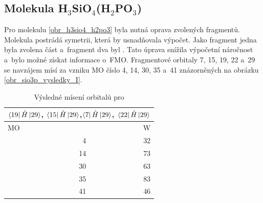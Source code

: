 \documentclass[
  printed, %
  table,   %
  lof,     %
  lot,     %
  oneside,
]{fithesis3}
\begin{document}
 \subsection{Molekula H$_3$SiO$_4$(H$_2$PO$_3$)}
 Pro molekulu  \ref{obr_h3sio4_h2po3} byla nutná oprava zvolených fragmentů. Molekula postrádá symetrii, která by usnadňovala výpočet. Jako fragment jedna byla zvolena část  a~fragment dva byl . Tato úprava snížila výpočetní náročnost a~bylo možné získat informace o~FMO. Fragmentové orbitaly  7, 15, 19, 22 a~29 se navzájem mísí za vzniku MO číslo 4, 14, 30, 35 a~41 znázorněných na obrázku \ref{obr_sio3p_vysledky_I}.   

\begin{figure}
\begin{center}
\label{obr_SiOH3OH2PO)_vysledky_I}
\end{center}
\end{figure}

\begin{table}[htbp]
\caption{Výsledné mísení orbitalů pro }
\begin{center}
\begin{tabular}{|r|r|}
\hline
\multicolumn{2}{|c|}{$\bra{19}{\hat{H}}\ket{29}$, $\bra{15}{\hat{H}}\ket{29}$,$\bra{7}{\hat{H}}\ket{29}$, $\bra{22}{\hat{H}}\ket{29}$} \\
\hline \hline
\multicolumn{1}{|l|}{MO} & \multicolumn{1}{r|}{W} \\ \hline
4 & 32 \\ \hline
14 & 73 \\ \hline
30 & 63 \\ \hline
35 & 83 \\ \hline
41 & 46 \\ \hline
\end{tabular}

\label{tab_sio3_vysledky}\end{center}
\end{table}
\end{document}
